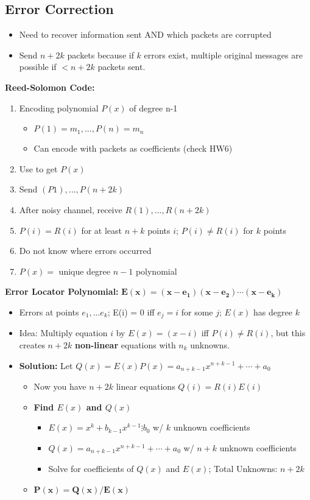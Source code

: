 \documentclass{article}\usepackage{amsmath,amssymb,amsthm,tikz,tkz-graph,color,chngpage,soul,hyperref,csquotes,graphicx,floatrow,polynom}\newcommand*{\QEDB}{\hfill\ensuremath{\square}}\newtheorem*{prop}{Proposition}\renewcommand{\theenumi}{\alph{enumi}}\usepackage[shortlabels]{enumitem}\usepackage[nobreak=true]{mdframed}\usetikzlibrary{matrix,calc}\MakeOuterQuote{"}\usepackage[margin=0.75in]{geometry} \newtheorem{theorem}{Theorem}
\begin{document}
\subsection*{Error Correction}
\begin{itemize}
\item Need to recover information sent AND which packets are corrupted
\item Send $n+2k$ packets because if $k$ errors exist, multiple original messages are possible if $< n+2k$ packets sent.
\end{itemize}
\begin{mdframed}
\textbf{Reed-Solomon Code:}
\begin{enumerate}[1.]
\item Encoding polynomial $P(x)$ of degree n-1
    \begin{itemize}
    \item $P(1) = m_1,..., P(n) = m_n$
    \item Can encode with packets as coefficients (check HW6)
    \end{itemize}
\item Use  to get $P(x)$
\item Send $(P1), ..., P(n+2k)$
\item After noisy channel, receive $R(1), ..., R(n+2k)$
\item $P(i) = R(i)$ for at least $n+k$ points $i$; $P(i) \ne R(i)$ for $k$ points
\item Do not know where errors occurred
\item $P(x) =$ unique degree $n-1$ polynomial
\end{enumerate}
\textbf{Error Locator Polynomial:} $\boldsymbol{E(x)=(x-e_1)(x-e_2)\cdots(x-e_k)}$
\begin{itemize}
\item Errors at points $e_1, ... e_k$; E(i) = 0 iff $e_j = i$ for some $j$; $E(x)$ has degree $k$
\item Idea: Multiply equation $i$ by $E(x) = (x - i)$ iff $P(i) \ne R(i)$, but this creates $n+2k$ \textbf{non-linear} equations with $n_k$ unknowns.
\item \textbf{Solution:} Let $Q(x) = E(x)P(x) = a_{n+k-1}x^{n+k-1} + \cdots + a_0$
    \begin{itemize}
    \item Now you have $n+2k$ linear equations $Q(i) = R(i)E(i)$
    \item \textbf{Find $E(x)$ and $Q(x)$}
        \begin{itemize}
            \item $E(x) = x^k+b_{k-1}x^{k-1}\vdots b_0$ w/ $k$ unknown coefficients
            \item $Q(x) = a_{n+k-1}x^{n+k-1} + \cdots + a_0$ w/ $n+k$ unknown coefficients
            \item Solve for coefficients of $Q(x)$ and $E(x)$; Total Unknowns: $n+2k$
        \end{itemize}
    \item $\boldsymbol{P(x) = Q(x)/E(x)}$
    \end{itemize}
\end{itemize}
\end{mdframed}
\end{document}
